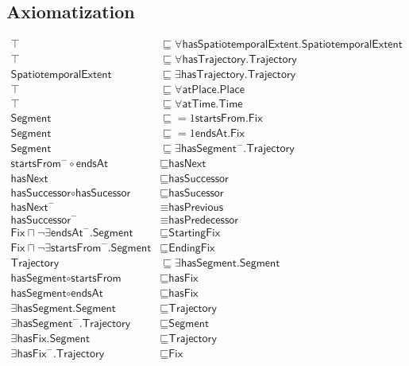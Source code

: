 \subsection{Axiomatization}
\label{axs:Spatiotemporal}
\begin{align}
\top &\sqsubseteq \forall \textsf{hasSpatiotemporalExtent.SpatiotemporalExtent} \\
\top &\sqsubseteq \forall \textsf{hasTrajectory.Trajectory} \\
\textsf{SpatiotemporalExtent} &\sqsubseteq \exists \textsf{hasTrajectory.Trajectory} \\
\top &\sqsubseteq \forall \textsf{atPlace.Place} \\
\top &\sqsubseteq \forall \textsf{atTime.Time} \\
\textsf{Segment} &\sqsubseteq \mathord{=1}\textsf{startsFrom.Fix}\\
\textsf{Segment} &\sqsubseteq \mathord{=1}\textsf{endsAt.Fix} \\
\textsf{Segment} &\sqsubseteq \exists \textsf{hasSegment}^-\textsf{.Trajectory} \\
\textsf{startsFrom}^- \circ \textsf{endsAt} &\sqsubseteq \textsf{hasNext} \\
\textsf{hasNext} &\sqsubseteq \textsf{hasSuccessor} \\
\textsf{hasSuccessor} \circ \textsf{hasSucessor} &\sqsubseteq \textsf{hasSucessor} \\
\textsf{hasNext}^- &\equiv \textsf{hasPrevious} \\
\textsf{hasSuccessor}^- &\equiv \textsf{hasPredecessor} \\
\textsf{Fix} \sqcap \lnot\exists\textsf{endsAt}^-\textsf{.Segment} &\sqsubseteq \textsf{StartingFix} \\
\textsf{Fix} \sqcap \lnot\exists\textsf{startsFrom}^-\textsf{.Segment} &\sqsubseteq \textsf{EndingFix} \\
\textsf{Trajectory} &\sqsubseteq \exists\textsf{hasSegment.Segment} \\
\textsf{hasSegment} \circ \textsf{startsFrom} &\sqsubseteq \textsf{hasFix} \\
\textsf{hasSegment} \circ \textsf{endsAt} &\sqsubseteq \textsf{hasFix} \\
\exists \textsf{hasSegment.Segment} &\sqsubseteq \textsf{Trajectory} \\
\exists \textsf{hasSegment}^-\textsf{.Trajectory} &\sqsubseteq \textsf{Segment} \\
\exists \textsf{hasFix.Segment} &\sqsubseteq \textsf{Trajectory} \\
\exists \textsf{hasFix}^-\textsf{.Trajectory} &\sqsubseteq \textsf{Fix}
\end{align}

